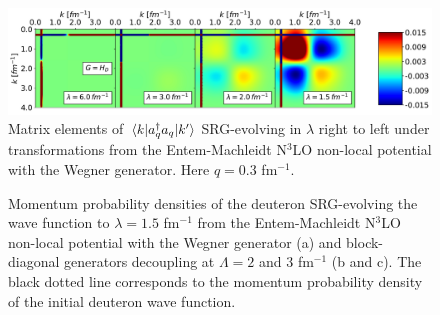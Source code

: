 \documentclass[preprintnumbers,floatfix,aps,prc,preprint,nofootinbib]{revtex4-1}
\begin{document}
\begin{figure}[H]
	\centering
	\includegraphics[clip,width=0.9\columnwidth]{momentum_projection_contours_q0,30_kvnn10_3S1_Wegner}
	\caption{Matrix elements of $\mel{k}{a^{\dagger}_q a_q}{k'}$ SRG-evolving in $\lambda$ right to left under transformations from the Entem-Machleidt N$^3$LO non-local potential with the Wegner generator. Here $q=0.3$ fm$^{-1}$.}
	\label{momentum_projection_contours_q0,30_kvnn10}
\end{figure}

\begin{figure}[H]
	\centering
	\quad
	\quad
	\caption{Momentum probability densities of the deuteron SRG-evolving the wave function to $\lambda=1.5$ fm$^{-1}$ from the Entem-Machleidt N$^3$LO non-local potential with the Wegner generator (a) and block-diagonal generators decoupling at $\Lambda=2$ and $3$ fm$^{-1}$ (b and c). The black dotted line corresponds to the momentum probability density of the initial deuteron wave function.}
	\label{deuteron_momentum_distribution_kvnn10}
\end{figure}
\end{document}
